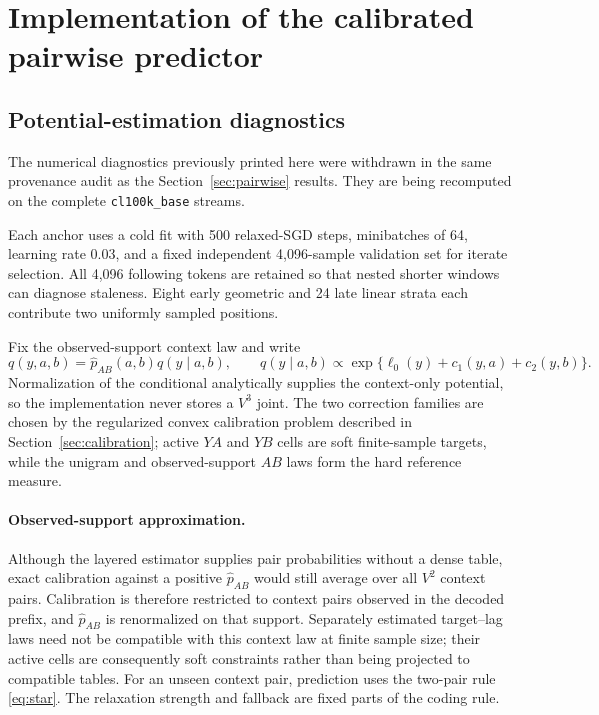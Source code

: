 \documentclass[11pt]{article}
\begin{document}
\appendix



\section{Implementation of the calibrated pairwise predictor}
\label{app:calibration-implementation}

\subsection*{Potential-estimation diagnostics}
The numerical diagnostics previously printed here were withdrawn in the same
provenance audit as the Section~\ref{sec:pairwise} results.  They are being
recomputed on the complete \texttt{cl100k\_base} streams.

Each anchor uses a cold fit with 500 relaxed-SGD steps, minibatches of 64,
learning rate $0.03$, and a fixed independent 4,096-sample validation set for
iterate selection.  All 4,096 following tokens are retained so that nested
shorter windows can diagnose staleness.  Eight early geometric and 24 late
linear strata each contribute two uniformly sampled positions.

Fix the observed-support context law and write
\begin{equation}
  q(y,a,b)=\widehat p_{AB}(a,b)q(y\mid a,b),
  \qquad
  q(y\mid a,b)\propto
  \exp\{\ell_0(y)+c_1(y,a)+c_2(y,b)\}.
  \label{eq:calibration-implementation}
\end{equation}
Normalization of the conditional analytically supplies the context-only
potential, so the implementation never stores a $V^3$ joint.  The two
correction families are chosen by the regularized convex calibration problem
described in Section~\ref{sec:calibration}; active $YA$ and $YB$ cells are
soft finite-sample targets, while the unigram and observed-support $AB$ laws
form the hard reference measure.

\paragraph{Observed-support approximation.}
Although the layered estimator supplies pair probabilities without a dense
table, exact calibration against a positive $\widehat p_{AB}$ would still
average over all $V^2$ context pairs.  Calibration is therefore restricted
to context pairs observed in the decoded prefix, and $\widehat p_{AB}$ is
renormalized on that support.  Separately estimated target--lag laws need not
be compatible with this context law at finite sample size; their active cells
are consequently soft constraints rather than being projected to compatible
tables.  For an unseen context pair, prediction uses the two-pair rule
\eqref{eq:star}.  The relaxation strength and fallback are fixed parts of the
coding rule.
\end{document}

